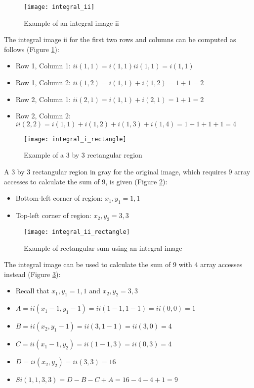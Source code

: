\begin{figure}[H]
  \centering
  \texttt{[image: integral\_ii]}
  \caption{Example of an integral image ii}
  \label{fig:integral-ii}
\end{figure}

The integral image ii for the first two rows and columns can be computed as follows (Figure \ref{fig:integral-ii}):

\begin{itemize}
  \item Row 1, Column 1: $ii(1,1)=i(1,1)ii(1,1)=i(1,1)$
  \item Row 1, Column 2: $ii(1,2)=i(1,1)+i(1,2)=1+1=2$
  \item Row 2, Column 1: $ii(2,1)=i(1,1)+i(2,1)=1+1=2$
  \item Row 2, Column 2: $ii(2,2)=i(1,1)+i(1,2)+i(1,3)+i(1,4)=1+1+1+1=4$
\end{itemize}

\begin{figure}[H]
  \centering
  \texttt{[image: integral\_i\_rectangle]}
  \caption{Example of a 3 by 3 rectangular region}
  \label{fig:integral-i-rectangle}
\end{figure}

A 3 by 3 rectangular region in gray for the original image, which requires 9 array accesses to calculate the sum of 9, is given (Figure \ref{fig:integral-i-rectangle}):

\begin{itemize}
  \item Bottom-left corner of region: $x_1,y_1=1,1$
  \item Top-left corner of region: $x_2,y_2=3,3$
\end{itemize}

\begin{figure}[H]
  \centering
  \texttt{[image: integral\_ii\_rectangle]}
  \caption{Example of rectangular sum using an integral image}
  \label{fig:integral-ii-rectangle}
\end{figure}

The integral image can be used to calculate the sum of 9 with 4 array accesses instead (Figure \ref{fig:integral-ii-rectangle}):

\begin{itemize}
  \item Recall that $x_1, y_1 = 1,1$ and $x_2, y_2 = 3,3$
  \item $A = ii(x_1 - 1,y_1 - 1) = ii(1 - 1, 1 - 1) = ii(0, 0) = 1$
  \item $B = ii(x_2,y_1 - 1)=ii(3, 1 - 1) = ii(3, 0) = 4$
  \item $C = ii(x_1 - 1, y_2) = ii(1-1,3) = ii(0, 3) = 4$
  \item $D = ii(x_2,y_2)=ii(3,3)=16$
  \item $Si(1, 1, 3, 3) = D - B - C + A = 16 - 4 - 4 + 1 = 9$
\end{itemize}

